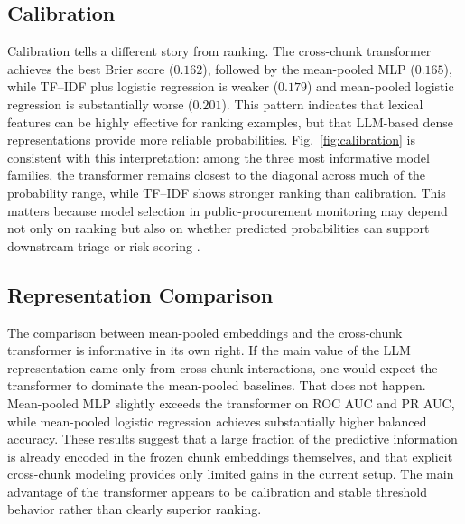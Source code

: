 \documentclass[conference]{IEEEtran}
\begin{document}
\subsection{Calibration}
Calibration tells a different story from ranking. The cross-chunk transformer achieves the best Brier score ($0.162$), followed by the mean-pooled MLP ($0.165$), while TF--IDF plus logistic regression is weaker ($0.179$) and mean-pooled logistic regression is substantially worse ($0.201$). This pattern indicates that lexical features can be highly effective for ranking examples, but that LLM-based dense representations provide more reliable probabilities. Fig.~\ref{fig:calibration} is consistent with this interpretation: among the three most informative model families, the transformer remains closest to the diagonal across much of the probability range, while TF--IDF shows stronger ranking than calibration. This matters because model selection in public-procurement monitoring may depend not only on ranking but also on whether predicted probabilities can support downstream triage or risk scoring \cite{silvafilho2023calibration}.

\subsection{Representation Comparison}
The comparison between mean-pooled embeddings and the cross-chunk transformer is informative in its own right. If the main value of the LLM representation came only from cross-chunk interactions, one would expect the transformer to dominate the mean-pooled baselines. That does not happen. Mean-pooled MLP slightly exceeds the transformer on ROC AUC and PR AUC, while mean-pooled logistic regression achieves substantially higher balanced accuracy. These results suggest that a large fraction of the predictive information is already encoded in the frozen chunk embeddings themselves, and that explicit cross-chunk modeling provides only limited gains in the current setup. The main advantage of the transformer appears to be calibration and stable threshold behavior rather than clearly superior ranking.
\end{document}
